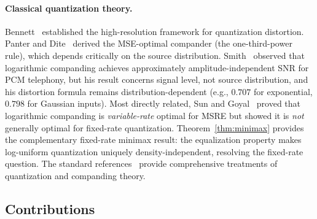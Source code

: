 \documentclass[11pt,letterpaper]{article}
\theoremstyle{definition}
\theoremstyle{remark}
\begin{document}
\paragraph{Classical quantization theory.}
Bennett~\cite{bennett1948} established the high-resolution framework for quantization
distortion.
Panter and Dite~\cite{panter1951} derived the MSE-optimal compander (the one-third-power
rule), which depends critically on the source distribution.
Smith~\cite{smith1957} observed that logarithmic companding achieves approximately
amplitude-independent SNR for PCM telephony, but his result concerns signal
level, not source distribution, and his distortion formula remains
distribution-dependent (e.g., $0.707$ for exponential, $0.798$ for Gaussian
inputs).
Most directly related, Sun and Goyal~\cite{sun2011} proved that logarithmic companding is
\emph{variable-rate} optimal for MSRE but showed it is \emph{not} generally
optimal for fixed-rate quantization.
Theorem~\ref{thm:minimax} provides the complementary fixed-rate minimax result:
the equalization property makes log-uniform quantization uniquely
density-independent, resolving the fixed-rate question.
The standard references~\cite{gray1998, gersho1992} provide comprehensive treatments of
quantization and companding theory.

\subsection{Contributions}
\end{document}
